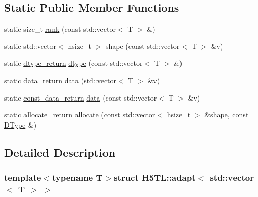 \subsection*{Static Public Member Functions}
\begin{DoxyCompactItemize}
\item 
static size\-\_\-t \hyperlink{struct_h5_t_l_1_1adapt_3_01std_1_1vector_3_01_t_01_4_01_4_ac99b0c519a406f524693224db5f6d0e5}{rank} (const std\-::vector$<$ T $>$ \&)
\item 
static std\-::vector$<$ hsize\-\_\-t $>$ \hyperlink{struct_h5_t_l_1_1adapt_3_01std_1_1vector_3_01_t_01_4_01_4_ad68841ab1e51a33f23256658c56ab4e8}{shape} (const std\-::vector$<$ T $>$ \&v)
\item 
static \hyperlink{struct_h5_t_l_1_1adapt_3_01std_1_1vector_3_01_t_01_4_01_4_a8ffca6b8ff7bf3a3c25a52d27f40febb}{dtype\-\_\-return} \hyperlink{struct_h5_t_l_1_1adapt_3_01std_1_1vector_3_01_t_01_4_01_4_a1c18df5a703997f5a9e7ab4612b0d1cc}{dtype} (const std\-::vector$<$ T $>$ \&)
\item 
static \hyperlink{struct_h5_t_l_1_1adapt_3_01std_1_1vector_3_01_t_01_4_01_4_a8ac9e6d104013a192b80a732918852ec}{data\-\_\-return} \hyperlink{struct_h5_t_l_1_1adapt_3_01std_1_1vector_3_01_t_01_4_01_4_a606b5a8618da5b23cc444a93bc34ed04}{data} (std\-::vector$<$ T $>$ \&v)
\item 
static \hyperlink{struct_h5_t_l_1_1adapt_3_01std_1_1vector_3_01_t_01_4_01_4_a51278a88e3f610f935350365d0d5102b}{const\-\_\-data\-\_\-return} \hyperlink{struct_h5_t_l_1_1adapt_3_01std_1_1vector_3_01_t_01_4_01_4_a150d1c4e481570a8f283692f6867d4ff}{data} (const std\-::vector$<$ T $>$ \&v)
\item 
static \hyperlink{struct_h5_t_l_1_1adapt_3_01std_1_1vector_3_01_t_01_4_01_4_a47c3e4fd67d82123fd8f2c9754502af6}{allocate\-\_\-return} \hyperlink{struct_h5_t_l_1_1adapt_3_01std_1_1vector_3_01_t_01_4_01_4_a93a1b0b4a4abd67e6aa97f80400f7967}{allocate} (const std\-::vector$<$ hsize\-\_\-t $>$ \&\hyperlink{struct_h5_t_l_1_1adapt_3_01std_1_1vector_3_01_t_01_4_01_4_ad68841ab1e51a33f23256658c56ab4e8}{shape}, const \hyperlink{class_h5_t_l_1_1_d_type}{D\-Type} \&)
\end{DoxyCompactItemize}


\subsection{Detailed Description}
\subsubsection*{template$<$typename T$>$struct H5\-T\-L\-::adapt$<$ std\-::vector$<$ T $>$ $>$}



